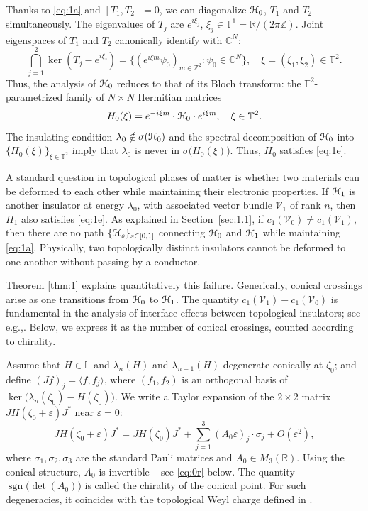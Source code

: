 \documentclass[11pt]{article}
\newcommand{\eg}{e.g.,\xspace}
\numberwithin{equation}{section}
\let\pazocal\EuScript
\let\sep:
\theoremstyle{definition}
\DeclareMathOperator{\sgn}{sgn}
\newcommand{\HH}{\pazocal{H}}
\newcommand{\VVV}{{\mathscr{V}}}
\newcommand{\C}{\mathbb{C}}
\newcommand{\Ll}{\mathbb{L}}
\newcommand{\R}{\mathbb{R}}
\newcommand{\Z}{\mathbb{Z}}
\newcommand{\Tt}{{\mathbb{T}}}
\let\epsi\varepsilon
\newcommand{\lr}[1]{\langle #1 \rangle}
\begin{document}
Thanks to \eqref{eq:1a} and $[T_1,T_2] = 0$, we can diagonalize $\HH_0$, $T_1$ and $T_2$ simultaneously. The eigenvalues of $T_j$ are $e^{i\xi_j}$, $\xi_j \in \Tt^1 = \R/(2\pi \Z)$. Joint eigenspaces of $T_1$ and $T_2$ canonically identify with $\C^N$:
\begin{equation*}
\bigcap_{j=1}^2 \ker\left(T_j-e^{i\xi_j}\right) = \bigl\{(e^{i\xi m} \psi_0)_{m \in \Z^2} \sep \psi_0 \in \C^N\bigr\} , \quad \xi =(\xi_1,\xi_2) \in \Tt^2.
\end{equation*}
Thus, the analysis of $\HH_0$ reduces to that of its Bloch transform: the $\Tt^2$-parametrized family of $N \times N$ Hermitian matrices
\begin{equation}\label{eq:3b}
H_0(\xi) = e^{-i\xi m} \cdot \HH_0 \cdot e^{i\xi m}, \quad \xi \in \Tt^2.
\end{equation}
The insulating condition $\lambda_0 \notin \sigma(\HH_0)$ and the spectral decomposition of $\HH_0$ into $\{ H_0(\xi) \}_{\xi \in \Tt^2}$ imply that $\lambda_0$ is never in $\sigma\bigl( H_0(\xi) \bigr)$. Thus, $H_0$ satisfies \eqref{eq:1e}.

A standard question in topological phases of matter is whether two materials can be deformed to each other while maintaining their electronic properties. If $\HH_1$ is another insulator at energy $\lambda_0$, with associated vector bundle $\VVV_1$ of rank $n$, then $H_1$ also satisfies \eqref{eq:1e}. As explained in Section~\ref{sec:1.1}, if $c_1(\VVV_0) \neq c_1(\VVV_1)$, then there are no path $\{\HH_s\}_{s \in [0,1]}$ connecting $\HH_0$ and $\HH_1$ while maintaining \eqref{eq:1a}. Physically, two topologically distinct insulators cannot be deformed to one another without passing by a conductor.

Theorem \ref{thm:1} explains quantitatively this failure. Generically, conical crossings arise as one transitions from $\HH_0$ to $\HH_1$. The quantity $c_1(\VVV_1) - c_1(\VVV_0)$ is fundamental in the analysis of interface effects between topological insulators; see \eg \cite{RH08,B19b,D19c}. Below, we express it as the number of conical crossings, counted according to chirality.

Assume that $H \in \Ll$ and $\lambda_n(H)$ and $\lambda_{n+1}(H)$ degenerate conically at $\zeta_0$; and define $(J f)_j = \lr{f, f_j}$, where $(f_1,f_2)$ is an orthogonal basis of $\ker\bigl(\lambda_n(\zeta_0) -H(\zeta_0)\bigr)$. We write a Taylor expansion of the $2 \times 2$ matrix $J H(\zeta_0+\epsi) J^*$ near $\epsi = 0$:
\begin{equation}\label{eq:1g}
J H(\zeta_0+\epsi) J^* = J H(\zeta_0) J^* + \sum_{j=1}^3 (A_0 \epsi)_j \cdot \sigma_j + O(\epsi^2),
\end{equation}
where $\sigma_1, \sigma_2, \sigma_3$ are the standard Pauli matrices and $A_0 \in M_3(\R)$.
Using the conical structure, $A_0$ is invertible -- see \eqref{eq:0r} below. The quantity $\sgn\bigl(\det(A_0) \bigr)$ is called the chirality of the conical point. For such degeneracies, it coincides with the topological Weyl charge defined in \cite{MP14}.
\end{document}
